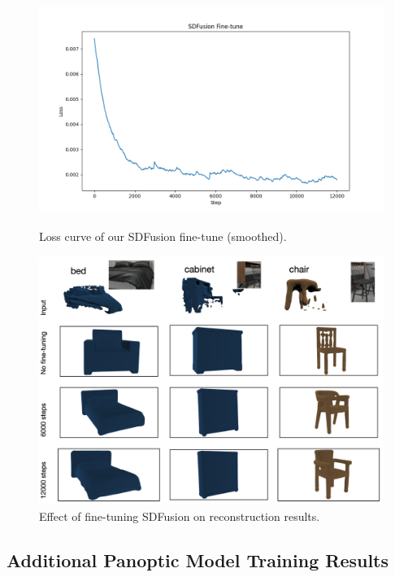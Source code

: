 \begin{figure}
  \centering
  \begin{minipage}{0.49\linewidth}
    \centering
  \includegraphics[width=\linewidth]{figs/sdfusion_finetune_loss_plot.png}
    \caption{Loss curve of our SDFusion fine-tune (smoothed).}
  \label{fig:finetune}
  \end{minipage}
  \hfill
  \begin{minipage}{0.49\linewidth}
    \centering
  \includegraphics[width=\linewidth]{images/image4.png}
    \caption{Effect of fine-tuning SDFusion on reconstruction results.}
    \label{fig:short-b}
  \end{minipage}
\end{figure}

\subsection{Additional Panoptic Model Training Results}

